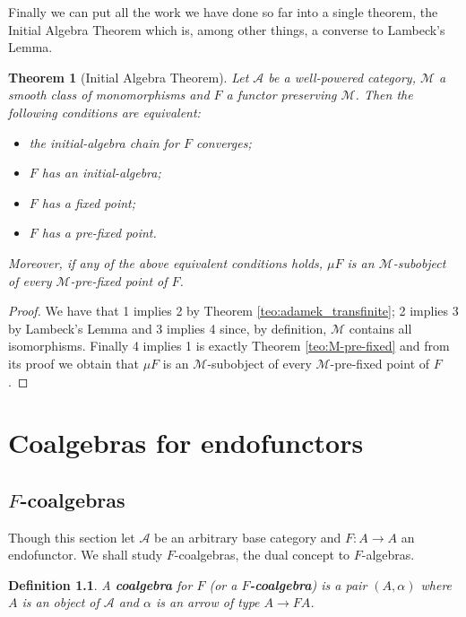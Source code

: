 \documentclass[letterpaper, 11pt, oneside]{memoir}
\theoremstyle{myteo}
\newtheorem{theorem}{Theorem}[section]
\newtheorem{definition}[theorem]{Definition}
\numberwithin{equation}{section}
\newcommand{\marginnote}[1]{\marginpar{\footnotesize #1}}
\newcommand{\A}{\mathscr{A}}
\begin{document}
Finally we can put all the work we have done so far into a single theorem, the Initial Algebra Theorem which is, among other things, a converse to Lambeck's Lemma.

\begin{theorem}[Initial Algebra Theorem]
  \label{teo:initial-algebra-theorem}
  Let \(\A\) be a well-powered category, \(\mathcal{M}\) a smooth class of monomorphisms and \(F\) a functor preserving \(\mathcal{M}\).
  Then the following conditions are equivalent:
  \begin{itemize}
  \item[1.] the initial-algebra chain for \(F\) converges;
  \item[2.] \(F\) has an initial-algebra;
  \item[3.] \(F\) has a fixed point;
  \item[4.] \(F\) has a pre-fixed point.
  \end{itemize}
  Moreover, if any of the above equivalent conditions holds, \(\mu F\) is an \(\mathcal{M}\)-subobject of every \(\mathcal{M}\)-pre-fixed point of \(F\).
\end{theorem}

\begin{proof}
  We have that 1 implies 2 by Theorem \ref{teo:adamek_transfinite}; 2 implies 3 by Lambeck's Lemma and 3 implies 4 since, by definition, \(\mathcal{M}\) contains all isomorphisms.
  Finally 4 implies 1 is exactly Theorem \ref{teo:M-pre-fixed} and from its proof we obtain that \(\mu F\) is an \(\mathcal{M}\)-subobject of every \(\mathcal{M}\)-pre-fixed point of \(F\).
\end{proof}

\chapter{Coalgebras for endofunctors}
\newpage

\section{\(F\)-coalgebras}

Though this section let \(\A\) be an arbitrary base category and \(F : A → A\) an endofunctor.
We shall study \(F\)-coalgebras, the dual concept to \(F\)-algebras.

\begin{definition}
  A \textbf{coalgebra} for \(F\) (or a \(F\)\textbf{-coalgebra})\marginnote{\(F\)-coalgebra} is a pair \((A, \alpha)\) where \(A\) is an object of \(\A\) and \(\alpha\) is an arrow of type \(A \to FA\).
\end{definition}
\end{document}
